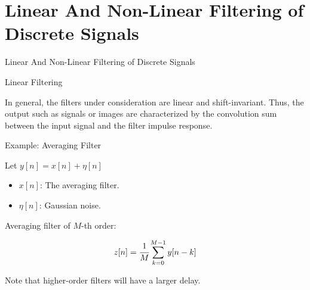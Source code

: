 \documentclass[aspectratio=169,xcolor=dvipsnames,svgnames,x11names,fleqn]{beamer}
\begin{document}
\begin{frame}{}
\vspace*{-9\baselineskip}
    \color{LightGray}{Blank space for calculation}
\end{frame}
\begin{frame}{}
\vspace*{-9\baselineskip}
    \color{LightGray}{Blank space for calculation}
\end{frame}
\begin{frame}{}
\vspace*{-9\baselineskip}
    \color{LightGray}{Blank space for calculation}
\end{frame}

\begin{frame}{}
\vspace*{-9\baselineskip}
    \color{LightGray}{Blank space for calculation}
\end{frame}

\section{Linear And Non-Linear Filtering of Discrete Signals}

\begin{frame}{}
    \begin{center}
    \Huge \bf \color{DarkBlue}
    
    \faFileAudioO
    
    Linear And Non-Linear Filtering of Discrete Signals
\end{center}
\end{frame}

\begin{frame}{Linear Filtering}

\large 
    In general, the filters under consideration are linear and shift-invariant. Thus, the output such as signals or images are characterized by the convolution sum between the input signal and the filter impulse response.
\end{frame}

\begin{frame}{Example: Averaging Filter}

    Let $y[n] = x[n] + \eta[n]$


\begin{itemize}
    \item $x[n]$: The averaging filter.
    \item $\eta[n]$: Gaussian noise.
\end{itemize}


Averaging filter of $M$-th order:

\Large
$$
z[n] = \cfrac{1}{M}\sum_{k=0}^{M-1} y[n-k]
$$

Note that higher-order filters will have a larger delay.

\end{frame}
\end{document}

